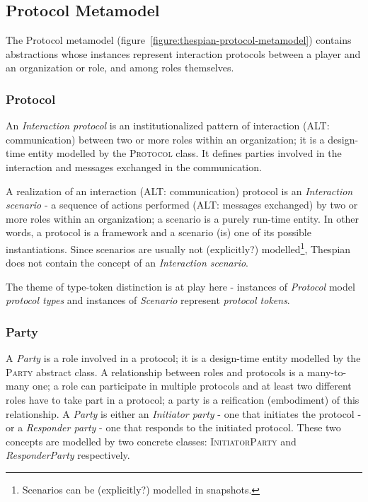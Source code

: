 \subsection{Protocol Metamodel}

The Protocol metamodel (figure~\ref{figure:thespian-protocol-metamodel}) contains abstractions whose instances represent interaction protocols between a player and an organization or role, and among roles themselves.

\subsubsection*{Protocol}

An \textit{Interaction protocol} is an institutionalized pattern of interaction (ALT: communication) between two or more roles within an organization; it is a design-time entity modelled by the \textsc{Protocol} class.
It defines parties involved in the interaction and messages exchanged in the communication.

A realization of an interaction (ALT: communication) protocol is an \textit{Interaction scenario} - a sequence of actions performed (ALT: messages exchanged) by two or more roles within an organization; a scenario is a purely run-time entity.
In other words, a protocol is a framework and a scenario (is) one of its possible instantiations.
Since scenarios are usually not (explicitly?) modelled\footnote{Scenarios can be (explicitly?) modelled in snapshots.}, Thespian does not contain the concept of an \textit{Interaction scenario}.

The theme of type-token distinction is at play here - instances of \textit{Protocol} model \textit{protocol types} and instances of \textit{Scenario} represent \textit{protocol tokens}.

\subsubsection*{Party}

A \textit{Party} is a role involved in a protocol; it is a design-time entity modelled by the \textsc{Party} abstract class.
A relationship between roles and protocols is a many-to-many one; a role can participate in multiple protocols and at least two different roles have to take part in a protocol; a party is a reification (embodiment) of this relationship.
A \textit{Party} is either an \textit{Initiator party} - one that initiates the protocol - or a \textit{Responder party} - one that responds to the initiated protocol. These two concepts are modelled by two concrete classes: \textsc{InitiatorParty} and \textsl{ResponderParty} respectively.

